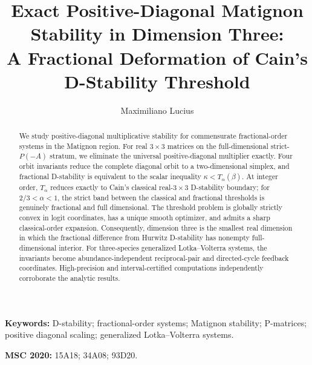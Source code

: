 \documentclass[11pt]{article}
\title{Exact Positive-Diagonal Matignon Stability in Dimension Three:\\
A Fractional Deformation of Cain's D-Stability Threshold}
\author{Maximiliano Lucius}
\date{}
\theoremstyle{definition}
\theoremstyle{remark}
\begin{document}
\maketitle

\begin{abstract}
We study positive-diagonal multiplicative stability for commensurate fractional-order systems in the Matignon region. For real \(3\times3\) matrices on the full-dimensional strict-\(P(-A)\) stratum, we eliminate the universal positive-diagonal multiplier exactly. Four orbit invariants reduce the complete diagonal orbit to a two-dimensional simplex, and fractional D-stability is equivalent to the scalar inequality \(\kappa<T_\alpha(\beta)\). At integer order, \(T_\alpha\) reduces exactly to Cain's classical real-\(3\times3\) D-stability boundary; for \(2/3<\alpha<1\), the strict band between the classical and fractional thresholds is genuinely fractional and full dimensional. The threshold problem is globally strictly convex in logit coordinates, has a unique smooth optimizer, and admits a sharp classical-order expansion. Consequently, dimension three is the smallest real dimension in which the fractional difference from Hurwitz D-stability has nonempty full-dimensional interior. For three-species generalized Lotka--Volterra systems, the invariants become abundance-independent reciprocal-pair and directed-cycle feedback coordinates. High-precision and interval-certified computations independently corroborate the analytic results.
\end{abstract}

\noindent\textbf{Keywords:}
D-stability; fractional-order systems; Matignon stability; P-matrices; positive diagonal scaling; generalized Lotka--Volterra systems.

\medskip
\noindent\textbf{MSC 2020:}
15A18; 34A08; 93D20.














\end{document}
